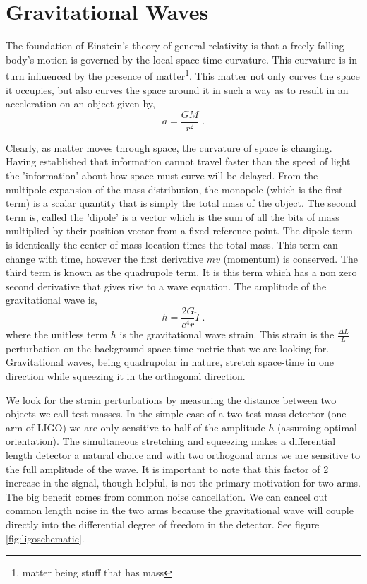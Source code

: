 \acresetall



\section{Gravitational Waves}

The foundation of Einstein's theory of general relativity is that a freely
falling body's motion is governed by the local space-time curvature.
This curvature is in turn influenced by the presence of
matter\footnote{matter being stuff that has mass}.
This matter not only curves the space it occupies, but also curves the space
around it in such a way as to result in an acceleration on an object given by,
\begin{equation}
a = \frac{GM}{r^2} \;.
\end{equation}

Clearly, as matter moves through space, the curvature of space is changing.
Having established that information cannot travel faster than the speed of light
the 'information' about how space must curve will be delayed.
From the multipole expansion of the mass distribution, the monopole (which is
the first term) is a scalar quantity that is simply the total
mass of the object.
The second term is, called the 'dipole' is a vector which is the sum of all the
bits of mass multiplied by their position vector from a fixed reference point.
The dipole term is identically the center of mass location times the total mass.
This term can change with time, however the first derivative $mv$ (momentum)
is conserved.
The third term is known as the quadrupole term.
It is this term which has a non zero second derivative that gives rise to a
wave equation.
The amplitude of the gravitational wave is,
\begin{equation}
h = \frac{2G}{c^4r}\ddot I \;.
\end{equation}
where the unitless term $h$ is the gravitational wave strain.
This strain is the $\frac{\Delta L}{L}$ perturbation on the background
space-time metric that we are looking for.
Gravitational waves, being quadrupolar in nature, stretch space-time in one
direction while squeezing it in the orthogonal direction.


We look for the strain perturbations by measuring the distance between two
objects we call test masses.
In the simple case of a two test mass detector (one arm of LIGO) we are only
sensitive to half of the amplitude $h$ (assuming optimal orientation).
The simultaneous stretching and squeezing makes a differential length detector
a natural choice and with two orthogonal arms we are sensitive to the full
amplitude of the wave.
It is important to note that this factor of 2 increase in the signal, though
helpful, is not the primary motivation for two arms. 
The big benefit comes from common noise cancellation.
We can cancel out common length noise in the two arms because the gravitational
wave will couple directly into the differential degree of freedom in the
detector. See figure \ref{fig:ligoschematic}.

